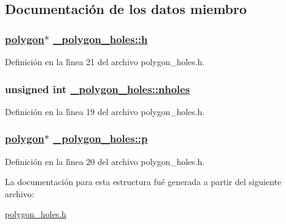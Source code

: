 \subsection{Documentaci\'{o}n de los datos miembro}
\hypertarget{struct__polygon__holes_b2a2b78ef53f56d9f4a7639c9dd15fd0_b2a2b78ef53f56d9f4a7639c9dd15fd0}{
\subsubsection[h]{\setlength{\rightskip}{0pt plus 5cm}\hyperlink{struct__polygon}{polygon}$\ast$ \hyperlink{struct__polygon__holes_b2a2b78ef53f56d9f4a7639c9dd15fd0_b2a2b78ef53f56d9f4a7639c9dd15fd0}{\_\-polygon\_\-holes::h}}}
\label{struct__polygon__holes_b2a2b78ef53f56d9f4a7639c9dd15fd0_b2a2b78ef53f56d9f4a7639c9dd15fd0}




Definici\'{o}n en la l\'{\i}nea 21 del archivo polygon\_\-holes.h.\hypertarget{struct__polygon__holes_dc7994045ce07712cf57b791ccaa0015_dc7994045ce07712cf57b791ccaa0015}{
\subsubsection[nholes]{\setlength{\rightskip}{0pt plus 5cm}unsigned int \hyperlink{struct__polygon__holes_dc7994045ce07712cf57b791ccaa0015_dc7994045ce07712cf57b791ccaa0015}{\_\-polygon\_\-holes::nholes}}}
\label{struct__polygon__holes_dc7994045ce07712cf57b791ccaa0015_dc7994045ce07712cf57b791ccaa0015}




Definici\'{o}n en la l\'{\i}nea 19 del archivo polygon\_\-holes.h.\hypertarget{struct__polygon__holes_90635c34b3613c8cf8cdda5bebe99638_90635c34b3613c8cf8cdda5bebe99638}{
\subsubsection[p]{\setlength{\rightskip}{0pt plus 5cm}\hyperlink{struct__polygon}{polygon}$\ast$ \hyperlink{struct__polygon__holes_90635c34b3613c8cf8cdda5bebe99638_90635c34b3613c8cf8cdda5bebe99638}{\_\-polygon\_\-holes::p}}}
\label{struct__polygon__holes_90635c34b3613c8cf8cdda5bebe99638_90635c34b3613c8cf8cdda5bebe99638}




Definici\'{o}n en la l\'{\i}nea 20 del archivo polygon\_\-holes.h.

La documentaci\'{o}n para esta estructura fu\'{e} generada a partir del siguiente archivo:\begin{CompactItemize}
\item 
\hyperlink{polygon__holes_8h}{polygon\_\-holes.h}\end{CompactItemize}
